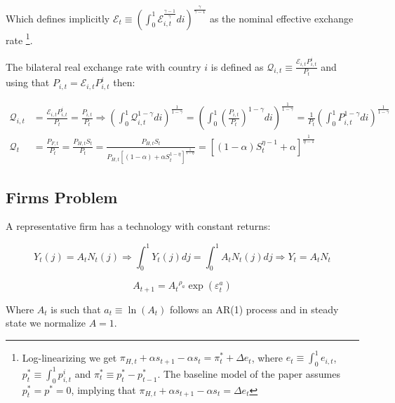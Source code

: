 \documentclass{article}
\newcommand{\E}{\mathcal{E}}
\begin{document}
Which defines implicitly $\E_{t} \equiv \left( \int^1_0 \E_{i,t}^{\frac{\gamma-1}{\gamma}} di \right)^{\frac{\gamma}{\gamma-1}}$ as the nominal effective exchange rate \footnote{Log-linearizing we get $\pi_{H,t} + \alpha s_{t+1} - \alpha s_t = \pi^*_t + \Delta e_t$, where $e_t \equiv \int^1_0 e_{i,t}$, $p_t^* \equiv \int^1_0 p^i_{i,t}$ and $\pi^*_t \equiv p_t^* - p_{t-1}^*$. The baseline model of the paper assumes $p_t^* = p^* = 0$, implying that $\pi_{H,t} + \alpha s_{t+1} - \alpha s_t = \Delta e_t$}.

The bilateral real exchange rate with country $i$ is defined as $\mathcal{Q}_{i,t} \equiv \frac{\E_{i,t} P^i_{i,t}}{P_t}$ and using that $P_{i,t} = \E_{i,t} P^i_{i,t}$ then:

\begin{equation}
\label{real_rate}
\begin{split}
\mathcal{Q}_{i,t} & = \frac{\E_{i,t} P^i_{i,t}}{P_t} = \frac{P_{i,t}}{P_t} \Rightarrow \left( \int^1_0 \mathcal Q_{i,t}^{1-\gamma} di \right)^{\frac{1}{1-\gamma}} = \left( \int^1_0 \left(\frac{P_{i,t}}{P_t}\right)^{1-\gamma} di \right)^{\frac{1}{1-\gamma}} = \frac{1}{P_t}\left( \int^1_0 P_{i,t}^{1-\gamma} di \right)^{\frac{1}{1-\gamma}} \\
\mathcal{Q}_{t} & = \frac{P_{F,t}}{P_t} = \frac{P_{H,t} S_t}{P_t} = \frac{P_{H,t} S_t}{P_{H,t} \left[(1-\alpha) + \alpha S_t^{1-\eta} \right]^{\frac{1}{1-\eta}}} = \left[(1-\alpha)S_t^{\eta-1} + \alpha \right]^{\frac{1}{\eta-1}}
\end{split}
\end{equation}


\subsection{Firms Problem}
A representative firm has a technology with constant returns:

\begin{equation}
    \label{technology}
    Y_t(j) = A_t N_t(j) \Rightarrow \int^1_0 Y_t(j) dj = \int^1_0 A_t N_t(j) dj \Rightarrow Y_t = A_t N_t
\end{equation}

\begin{equation}
    \label{tfp}
    A_{t+1} = {A_t}^{\rho_a}\exp( \varepsilon^a_t)
\end{equation}

Where $A_t$ is such that $a_t \equiv \ln(A_t)$ follows an AR(1) process and in steady state we normalize $A = 1$.\\
\end{document}
